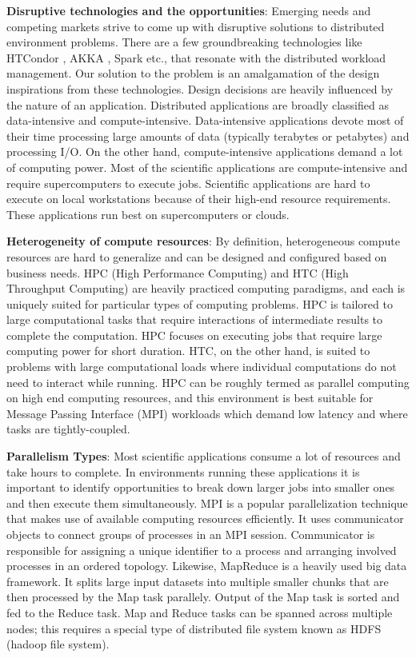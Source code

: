 \documentclass[sigconf]{acmart}
\begin{document}
\textbf{Disruptive technologies and the opportunities}: Emerging needs and competing markets strive to come up with disruptive solutions to distributed environment problems. There are a few groundbreaking technologies like HTCondor \cite{tannenbaum2001condor,thain2005distributed}, AKKA \cite{akka}, Spark \cite{zaharia2010spark} etc., that resonate with the distributed workload management. Our solution to the problem is an amalgamation of the design inspirations from these technologies. Design decisions are heavily influenced by the nature of an application. Distributed applications are broadly classified as data-intensive and compute-intensive. Data-intensive applications devote most of their time processing large amounts of data (typically terabytes or petabytes) and processing I/O. On the other hand, compute-intensive applications demand a lot of computing power. Most of the scientific applications are compute-intensive and require supercomputers to execute jobs. Scientific applications are hard to execute on local workstations because of their high-end resource requirements. These applications run best on supercomputers or clouds. \newline
  
\textbf{Heterogeneity of compute resources}: By definition, heterogeneous compute resources are hard to generalize and can be designed and configured based on business needs. HPC (High Performance Computing) and HTC (High Throughput Computing) are heavily practiced computing paradigms, and each is uniquely suited for particular types of computing problems. HPC is tailored to large computational tasks that require interactions of intermediate results to complete the computation.  HPC focuses on executing jobs that require large computing power for short duration. HTC, on the other hand, is suited to problems with large computational loads where individual computations do not need to interact while running.   HPC can be roughly termed as parallel computing on high end computing resources, and this environment is best suitable for Message Passing Interface (MPI) workloads which demand low latency and where tasks are tightly-coupled. \newline
  
\textbf{Parallelism Types}: Most scientific applications consume a lot of resources and take hours to complete. In environments running these applications it is important to identify opportunities to break down larger jobs into smaller ones and then execute them simultaneously. MPI is a popular parallelization technique that makes use of available computing resources efficiently. It uses communicator objects to connect groups of processes in an MPI session. Communicator is responsible for assigning a unique identifier to a process and arranging involved processes in an ordered topology. Likewise, MapReduce is a heavily used big data framework. It splits large input datasets into multiple smaller chunks that are then processed by the Map task parallely. Output of the Map task is sorted and fed to the Reduce task. Map and Reduce tasks can be spanned across multiple nodes; this requires a special type of distributed file system known as HDFS (hadoop file system). \newline
\end{document}
